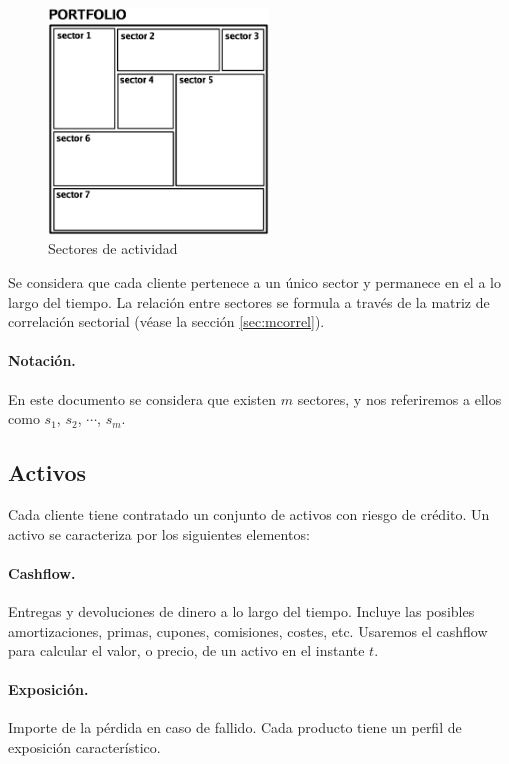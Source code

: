 \begin{figure}[!hb]
\begin{center}
\includegraphics[height=6cm, angle=0]{./images/sectors.eps}
\caption{Sectores de actividad}
\label{sectors}
\end{center}
\end{figure}
Se considera que cada cliente pertenece a un \'unico sector y permanece en 
el a lo largo del tiempo. La relaci\'on entre sectores se formula a trav\'es 
de la matriz de correlaci\'on sectorial (v\'ease la secci\'on \ref{sec:mcorrel}).
\paragraph{Notaci\'on.} En este documento se considera que existen $m$ 
sectores, y nos referiremos a ellos como $s_1$, $s_2$, $\cdots$, $s_m$.

\subsection{Activos}

Cada cliente tiene contratado un conjunto de activos con riesgo de cr\'edito.
Un activo se caracteriza por los siguientes elementos:

\paragraph{Cashflow.} Entregas y devoluciones de dinero a lo largo del tiempo. 
Incluye las posibles amortizaciones, primas, cupones, comisiones, costes, etc. 
Usaremos el cashflow para calcular el valor, o precio, de un activo en el 
instante $t$.

\paragraph{Exposici\'on.} Importe de la p\'erdida en caso de fallido. Cada 
producto tiene un perfil de exposici\'on caracter\'istico.

